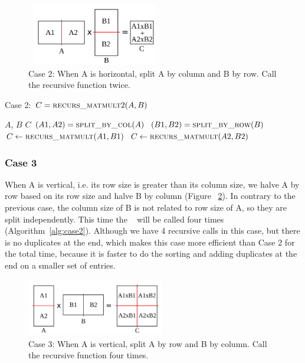 \begin{figure}[tbh]
 \centering
 \includegraphics[width=6cm,height=2.7cm]{./figures/case2_001.pdf}
 \caption{Case 2: When A is horizontal, split A by column and B by row. Call the recursive function twice.}
 \label{fig:case2}
\end{figure}

\begin{algorithm}[H] 
  \caption{Case 2: $C = \textsc{recurs\_matmult}2(A, B)$} \label{alg:case2} 
  \begin{algorithmic}[1]
    \Require $A$, $B$
    \Ensure  $C$
    \State $(A1, A2) = \textsc{split\_by\_col}(A)$
    \State $(B1, B2) = \textsc{split\_by\_row}(B)$
    \State $C \leftarrow \textsc{recurs\_matmult}(A1,B1)$
    \State $C \leftarrow \textsc{recurs\_matmult}(A2,B2)$
  \end{algorithmic}
\end{algorithm}

\subsubsection{Case 3}
\label{sec:case3}
When A is vertical, i.e. its row size is greater than its column size, we halve A by row based on its row size and halve B by column (Figure ~\ref{fig:case3}). In contrary to the previous case, the column size of B is not related to row size of A, so they are split independently. This time the \recmm~ will be called four times (Algorithm~\ref{alg:case2}).  Although we have 4 recursive calls in this case, but there is no duplicates at the end, which makes this case more efficient than Case 2 for the total time, because it is faster to do the sorting and adding duplicates at the end on a smaller set of entries. 

\begin{figure}[tbh]
 \centering
 \includegraphics[width=6cm,height=2.5cm]{./figures/case3_001.pdf}
 \caption{Case 3: When A is vertical, split A by row and B by column. Call the recursive function four times.}
 \label{fig:case3}
\end{figure}


